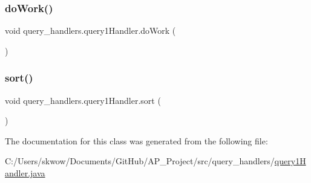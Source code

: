 \hypertarget{classquery__handlers_1_1query1_handler_a6e9b752a4ad27626e66dd07bd45661df}{}\label{classquery__handlers_1_1query1_handler_a6e9b752a4ad27626e66dd07bd45661df} 
\subsubsection{\texorpdfstring{do\+Work()}{doWork()}}
{\footnotesize\ttfamily void query\+\_\+handlers.\+query1\+Handler.\+do\+Work (\begin{DoxyParamCaption}{ }\end{DoxyParamCaption})}

\hypertarget{classquery__handlers_1_1query1_handler_ad31be63c673088813821cb1150c8506e}{}\label{classquery__handlers_1_1query1_handler_ad31be63c673088813821cb1150c8506e} 
\subsubsection{\texorpdfstring{sort()}{sort()}}
{\footnotesize\ttfamily void query\+\_\+handlers.\+query1\+Handler.\+sort (\begin{DoxyParamCaption}{ }\end{DoxyParamCaption})}



The documentation for this class was generated from the following file\+:\begin{DoxyCompactItemize}
\item 
C\+:/\+Users/skwow/\+Documents/\+Git\+Hub/\+A\+P\+\_\+\+Project/src/query\+\_\+handlers/\hyperlink{query1_handler_8java}{query1\+Handler.\+java}\end{DoxyCompactItemize}
